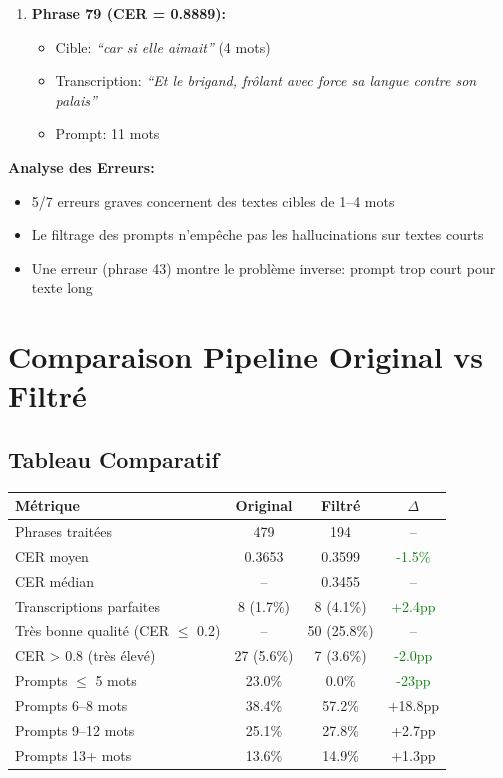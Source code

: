 \documentclass[12pt,a4paper]{article}
\begin{document}
\begin{enumerate}
    \item \textbf{Phrase 79 (CER = 0.8889):}
    \begin{itemize}
        \item Cible: \textit{``car si elle aimait''} (4 mots)
        \item Transcription: \textit{``Et le brigand, frôlant avec force sa langue contre son palais''}
        \item Prompt: 11 mots
    \end{itemize}
\end{enumerate}

\textbf{Analyse des Erreurs:}
\begin{itemize}
    \item 5/7 erreurs graves concernent des textes cibles de 1--4 mots
    \item Le filtrage des prompts n'empêche pas les hallucinations sur textes courts
    \item Une erreur (phrase 43) montre le problème inverse: prompt trop court pour texte long
\end{itemize}

\section{Comparaison Pipeline Original vs Filtré}

\subsection{Tableau Comparatif}

\begin{center}
\begin{tabular}{|l|c|c|c|}
\hline
\textbf{Métrique} & \textbf{Original} & \textbf{Filtré} & \textbf{$\Delta$} \\
\hline
Phrases traitées & 479 & 194 & -- \\
CER moyen & 0.3653 & 0.3599 & \textcolor{green}{-1.5\%} \\
CER médian & -- & 0.3455 & -- \\
\hline
Transcriptions parfaites & 8 (1.7\%) & 8 (4.1\%) & \textcolor{green}{+2.4pp} \\
Très bonne qualité (CER $\leq$ 0.2) & -- & 50 (25.8\%) & -- \\
CER > 0.8 (très élevé) & 27 (5.6\%) & 7 (3.6\%) & \textcolor{green}{-2.0pp} \\
\hline
Prompts $\leq$ 5 mots & 23.0\% & 0.0\% & \textcolor{green}{-23pp} \\
Prompts 6--8 mots & 38.4\% & 57.2\% & +18.8pp \\
Prompts 9--12 mots & 25.1\% & 27.8\% & +2.7pp \\
Prompts 13+ mots & 13.6\% & 14.9\% & +1.3pp \\
\hline
\end{tabular}
\end{center}
\end{document}
